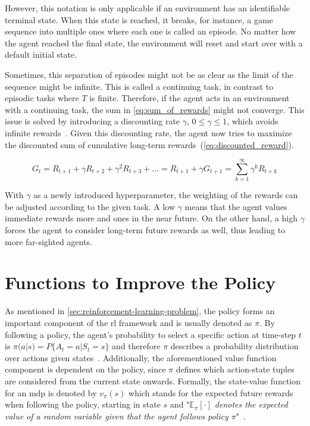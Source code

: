 \documentclass[draft,final]{vutinfth} %
\newcommand{\pautoref}[1]{(\autoref{#1})}
\newcommand{\p}[1]{see p. #1}
\begin{document}
    However, this notation is only applicable if an environment has an identifiable terminal state.
    When this state is reached, it breaks, for instance, a game sequence into multiple ones where each one is called an episode.
    No matter how the agent reached the final state, the environment will reset and start over with a default initial state.

    Sometimes, this separation of episodes might not be as clear as the limit of the sequence might be infinite.
    This is called a continuing task, in contrast to episodic tasks where $T$ is finite.
    Therefore, if the agent acts in an environment with a continuing task, the sum in \autoref{eq:sum_of_rewards} might not converge.
    This issue is solved by introducing a discounting rate $\gamma$, $0 \leq \gamma \leq 1$, which avoids infinite rewards~\citep[\p{54f}]{sutton_reinforcement_2018}.
    Given this discounting rate, the agent now tries to maximize the discounted sum of cumulative long-term rewards~\pautoref{eq:discounted_reward}.

    \begin{equation}
        G_t = R_{t+1} + \gamma R_{t+2}+ \gamma^2 R_{t+3} + \ldots = R_{t+1} + \gamma G_{t+1} = \sum_{k=1}^{\infty} \gamma^k R_{t+k}\label{eq:discounted_reward}
    \end{equation}

    With $\gamma$ as a newly introduced hyperparameter, the weighting of the rewards can be adjusted according to the given task.
    A low $\gamma$ means that the agent values immediate rewards more and ones in the near future.
    On the other hand, a high $\gamma$ forces the agent to consider long-term future rewards as well, thus leading to more far-sighted agents.


    \section{Functions to Improve the Policy}\label{sec:functions-to-improve-the-policy}
    As mentioned in \autoref{sec:reinforcement-learning-problem}, the policy forms an important component of the \gls{rl} framework and is usually denoted as $\pi$.
    By following a policy, the agent's probability to select a specific action at time-step $t$ is $\pi(a|s) = P\{A_t=a|S_t=s\}$ and therefore $\pi$ describes a probability distribution over actions given states~.
    Additionally, the aforementioned value function component is dependent on the policy, since $\pi$ defines which action-state tuples are considered from the current state onwards.
    Formally, the state-value function for an \gls{mdp} is denoted by $v_\pi(s)$ which stands for the expected future rewards when following the policy, starting in state $s$ and "\textit{$\mathbb{E}_\pi[\cdot]$ denotes the expected value of a random variable given that the agent follows policy $\pi$}"~\citep[\p{58}]{sutton_reinforcement_2018}.
\end{document}
